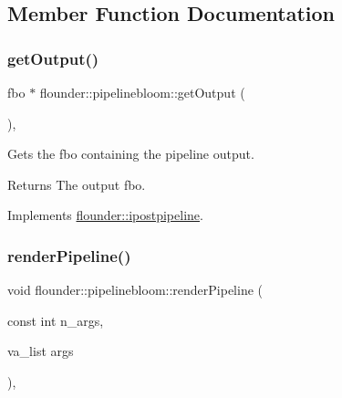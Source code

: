 \subsection{Member Function Documentation}
\mbox{\label{classflounder_1_1pipelinebloom_a0ab1108f9115014014f7a8bd5ca5ac34}} 
\subsubsection{\texorpdfstring{get\+Output()}{getOutput()}}
{\footnotesize\ttfamily fbo $\ast$ flounder\+::pipelinebloom\+::get\+Output (\begin{DoxyParamCaption}{ }\end{DoxyParamCaption})\hspace{0.3cm}{\ttfamily [override]}, {\ttfamily [virtual]}}



Gets the fbo containing the pipeline output. 

\begin{DoxyReturn}{Returns}
The output fbo. 
\end{DoxyReturn}


Implements \hyperlink{classflounder_1_1ipostpipeline_a08f5d19b9652528337b73c2f4e0e4258}{flounder\+::ipostpipeline}.

\mbox{\label{classflounder_1_1pipelinebloom_a6ef1ad3bceb0239ed08148cdbce477e2}} 
\subsubsection{\texorpdfstring{render\+Pipeline()}{renderPipeline()}}
{\footnotesize\ttfamily void flounder\+::pipelinebloom\+::render\+Pipeline (\begin{DoxyParamCaption}\item[{const int}]{n\+\_\+args,  }\item[{va\+\_\+list}]{args }\end{DoxyParamCaption})\hspace{0.3cm}{\ttfamily [override]}, {\ttfamily [virtual]}}



